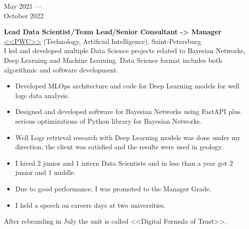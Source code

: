 \documentclass[10pt,a4paper]{article}
\newcommand{\lmpratio}{0.15}
\newcommand{\rmpratio}{0.74}
\newcommand{\vSpace}{0.5cm}
\newcommand{\horizontalSpace}{0.05\textwidth}
\newcommand{\sectionMain}[1]{\textbf{#1}}
\begin{document}
 
	\begin{minipage}[t]{\lmpratio\textwidth}
		May 2021 --- \\October 2022
	\end{minipage}
	\hspace{\horizontalSpace}
	\begin{minipage}[t]{\rmpratio\textwidth}
		\sectionMain{Lead Data Scientist/Team Lead/Senior Consultant -> Manager}\\
		\href{https://www.pwc.ru/}{<<PWC>>} (Technology, Artificial Intelligence), Saint-Petersburg\\[0.1cm]		

I led and developed multiple Data Science projects related to Bayesian Networks, Deep Learning and Machine Learning.
Data Science format includes both algorithmic and software development.

		\begin{itemize}
                \item 
Developed MLOps architecture and code for Deep Learning models for well logs data analysis.
			\item 
Designed and developed software for Bayesian Networks using FastAPI plus serious optimizations of Python library for Bayesian Networks.
			\item 
Well Logs retrieval research with Deep Learning models was done under my direction, the client was satisfied and the results were used in geology.
                \item 
I hired 2 junior and 1 intern Data Scientists and in less than a year got 2 junior and 1 middle.
                \item 
Due to good performance, I was promoted to the Manager Grade.
                \item 
I held a speech on careers days at two universities.
		\end{itemize}
		
After rebranding in July the unit is called <<Digital Formula of Trust>>.
		
	\end{minipage}	
	\vspace{\vSpace}
	
\end{document}
